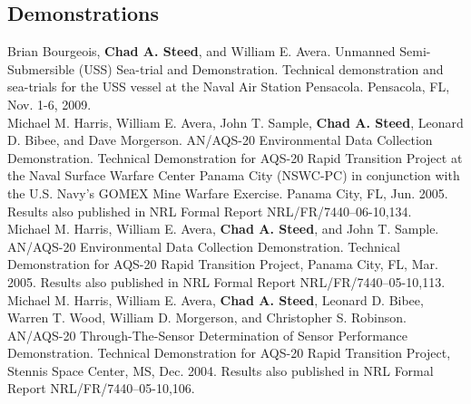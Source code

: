 \documentclass[11pt, letterpaper]{article}
\newcommand{\years}[1]{\marginnote{\scriptsize #1}}
\begin{document}
\subsection*{Demonstrations}

\noindent\years{2009}Brian Bourgeois, \textbf{Chad A. Steed}, and William
E. Avera. Unmanned Semi-Submersible (USS) Sea-trial and Demonstration.
Technical demonstration and sea-trials for the USS vessel at the Naval Air
Station Pensacola.  Pensacola, FL, Nov. 1-6, 2009.\\
\years{2005}Michael M. Harris, William E. Avera, John T. Sample,
\textbf{Chad A. Steed}, Leonard D. Bibee, and Dave Morgerson.
AN/AQS-20 Environmental Data Collection Demonstration.  Technical
Demonstration for AQS-20 Rapid Transition Project at the Naval Surface
Warfare Center Panama City (NSWC-PC) in conjunction with the U.S. Navy’s
GOMEX Mine Warfare Exercise.  Panama City, FL, Jun. 2005.  Results also
published in NRL Formal Report NRL/FR/7440–06-10,134.\\
\years{2005}Michael M. Harris, William E. Avera, \textbf{Chad A. Steed},
and John T. Sample.  AN/AQS-20 Environmental Data Collection Demonstration.
Technical Demonstration for AQS-20 Rapid Transition Project, Panama
City, FL, Mar. 2005.  Results also published in NRL Formal Report
NRL/FR/7440–05-10,113.\\
\years{2004}Michael M. Harris, William E. Avera, \textbf{Chad A. Steed},
Leonard D. Bibee, Warren T. Wood, William D. Morgerson, and
Christopher S. Robinson.  AN/AQS-20 Through-The-Sensor Determination of
Sensor Performance Demonstration. Technical Demonstration for AQS-20 Rapid
Transition Project, Stennis Space Center, MS, Dec. 2004.  Results also
published in NRL Formal Report NRL/FR/7440–05-10,106.
\end{document}
